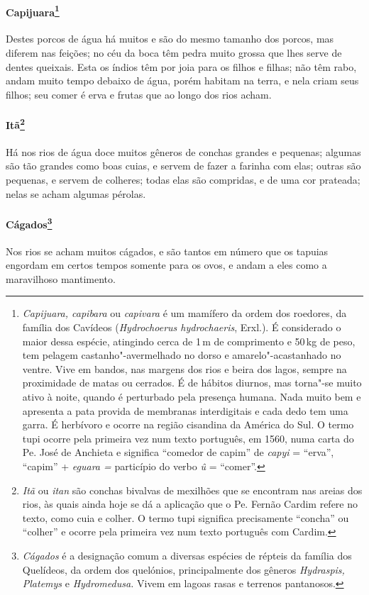 \paragraph{Capijuara\footnote{ \textit{Capijuara, capibara} ou
\textit{capivara} é um mamífero da ordem dos roedores, da família
dos Cavídeos (\textit{Hydrochoerus hydrochaeris}, Erxl.). É
considerado o maior dessa espécie, atingindo cerca de 1\,m de comprimento
e 50\,kg de peso, tem pelagem castanho"-avermelhado no dorso e
amarelo"-acastanhado no ventre. Vive em bandos, nas margens dos rios e
beira dos lagos, sempre na proximidade de matas ou cerrados. É de
hábitos diurnos, mas torna"-se muito ativo à noite, quando é perturbado
pela presença humana. Nada muito bem e apresenta a pata provida de
membranas interdigitais e cada dedo tem uma garra. É herbívoro e ocorre
na região cisandina da América do Sul. O termo tupi ocorre pela
primeira vez num texto português, em 1560, numa carta do Pe.
José de Anchieta e significa ``comedor de capim'' de \textit{capyi} = 
``erva'', ``capim'' + \textit{eguara =} particípio do verbo \textit{û} = 
``comer''.}} Destes porcos de água há muitos e são do mesmo
tamanho dos porcos, mas diferem nas feições; no céu da boca têm pedra
muito grossa que lhes serve de dentes queixais. Esta os índios têm por
joia para os filhos e filhas; não têm rabo, andam muito tempo debaixo
de água, porém habitam na terra, e nela criam seus filhos; seu comer é
erva e frutas que ao longo dos rios acham.

\paragraph{Itã\footnote{ \textit{Itã} ou \textit{itan} são conchas
bivalvas de mexilhões que se encontram nas areias dos rios, às quais
ainda hoje se dá a aplicação que o Pe. Fernão Cardim refere no texto,
como cuia e colher. O termo tupi significa precisamente ``concha'' ou
``colher'' e ocorre pela primeira vez num texto português com
Cardim.}} Há nos rios de água doce muitos gêneros de conchas
grandes e pequenas; algumas são tão grandes como boas cuias, e servem
de fazer a farinha com elas; outras são pequenas, e servem de colheres;
todas elas são compridas, e de uma cor prateada; nelas se acham algumas pérolas.

\paragraph{Cágados\footnote{ \textit{Cágados} é a designação comum a
diversas espécies de répteis da família dos Quelídeos, da ordem dos
quelónios, principalmente dos gêneros \textit{Hydraspis, Platemys} e 
\textit{Hydromedusa.} Vivem em lagoas rasas e terrenos pantanosos.}}
 Nos rios se acham muitos cágados, e são tantos em número
que os tapuias engordam em certos tempos somente para os ovos, e andam
a eles como a maravilhoso mantimento.

